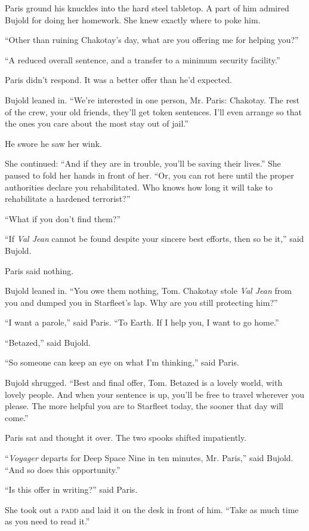 \documentclass[twoside,letterpaper,12pt]{memoir}
\begin{document}
Paris ground his knuckles into the hard steel tabletop. A part of him admired Bujold for doing her homework. She knew exactly where to poke him.

``Other than ruining Chakotay's day, what are you offering me for helping you?''

``A reduced overall sentence, and a transfer to a minimum security facility.''

Paris didn't respond. It was a better offer than he'd expected.

Bujold leaned in. ``We're interested in one person, Mr. Paris: Chakotay. The rest of the crew, your old friends, they'll get token sentences. I'll even arrange so that the ones you care about the most stay out of jail.''

He swore he saw her wink.

She continued: ``And if they are in trouble, you'll be saving their lives.'' She paused to fold her hands in front of her. ``Or, you can rot here until the proper authorities declare you rehabilitated. Who knows how long it will take to rehabilitate a hardened terrorist?''

``What if you don't find them?''

``If \textit{Val Jean} cannot be found despite your sincere best efforts, then so be it,'' said Bujold.

Paris said nothing.

Bujold leaned in. ``You owe them nothing, Tom. Chakotay stole \textit{Val Jean} from you and dumped you in Starfleet's lap. Why are you still protecting him?''

``I want a parole,'' said Paris. ``To Earth. If I help you, I want to go home.''

``Betazed,'' said Bujold.

``So someone can keep an eye on what I'm thinking,'' said Paris.

Bujold shrugged. ``Best and final offer, Tom. Betazed is a lovely world, with lovely people. And when your sentence is up, you'll be free to travel wherever you please. The more helpful you are to Starfleet today, the sooner that day will come.''

Paris sat and thought it over. The two spooks shifted impatiently.

``\textit{Voyager} departs for Deep Space Nine in ten minutes, Mr. Paris,'' said Bujold. ``And so does this opportunity.''

``Is this offer in writing?'' said Paris.

She took out a \textsc{padd} and laid it on the desk in front of him. ``Take as much time as you need to read it.''
\end{document}
